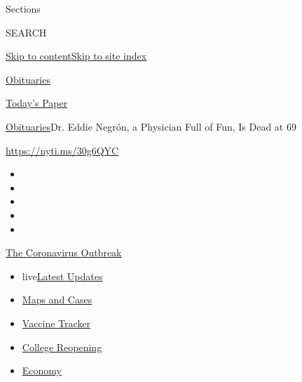 Sections

SEARCH

\protect\hyperlink{site-content}{Skip to
content}\protect\hyperlink{site-index}{Skip to site index}

\href{https://www.nytimes3xbfgragh.onion/section/obituaries}{Obituaries}

\href{https://myaccount.nytimes3xbfgragh.onion/auth/login?response_type=cookie\&client_id=vi}{}

\href{https://www.nytimes3xbfgragh.onion/section/todayspaper}{Today's
Paper}

\href{/section/obituaries}{Obituaries}\textbar{}Dr. Eddie Negrón, a
Physician Full of Fun, Is Dead at 69

\url{https://nyti.ms/30g6QYC}

\begin{itemize}
\item
\item
\item
\item
\item
\end{itemize}

\href{https://www.nytimes3xbfgragh.onion/news-event/coronavirus?action=click\&pgtype=Article\&state=default\&region=TOP_BANNER\&context=storylines_menu}{The
Coronavirus Outbreak}

\begin{itemize}
\tightlist
\item
  live\href{https://www.nytimes3xbfgragh.onion/2020/08/04/world/coronavirus-cases.html?action=click\&pgtype=Article\&state=default\&region=TOP_BANNER\&context=storylines_menu}{Latest
  Updates}
\item
  \href{https://www.nytimes3xbfgragh.onion/interactive/2020/us/coronavirus-us-cases.html?action=click\&pgtype=Article\&state=default\&region=TOP_BANNER\&context=storylines_menu}{Maps
  and Cases}
\item
  \href{https://www.nytimes3xbfgragh.onion/interactive/2020/science/coronavirus-vaccine-tracker.html?action=click\&pgtype=Article\&state=default\&region=TOP_BANNER\&context=storylines_menu}{Vaccine
  Tracker}
\item
  \href{https://www.nytimes3xbfgragh.onion/2020/08/02/us/covid-college-reopening.html?action=click\&pgtype=Article\&state=default\&region=TOP_BANNER\&context=storylines_menu}{College
  Reopening}
\item
  \href{https://www.nytimes3xbfgragh.onion/live/2020/08/04/business/stock-market-today-coronavirus?action=click\&pgtype=Article\&state=default\&region=TOP_BANNER\&context=storylines_menu}{Economy}
\end{itemize}

